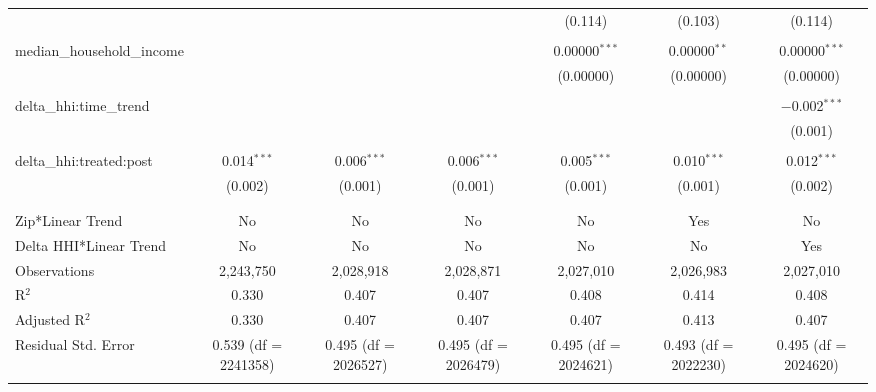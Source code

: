 \begin{table}[H]
{\begin{tabular}{@{\extracolsep{5pt}}lcccccc}
   &  &  &  & (0.114) & (0.103) & (0.114) \\  

   & & & & & & \\  

  median\_household\_income &  &  &  & 0.00000$^{***}$ & 0.00000$^{**}$ & 0.00000$^{***}$ \\  

   &  &  &  & (0.00000) & (0.00000) & (0.00000) \\  

   & & & & & & \\  

  delta\_hhi:time\_trend &  &  &  &  &  & $-$0.002$^{***}$ \\  

   &  &  &  &  &  & (0.001) \\  

   & & & & & & \\  

  delta\_hhi:treated:post & 0.014$^{***}$ & 0.006$^{***}$ & 0.006$^{***}$ & 0.005$^{***}$ & 0.010$^{***}$ & 0.012$^{***}$ \\  

   & (0.002) & (0.001) & (0.001) & (0.001) & (0.001) & (0.002) \\  

   & & & & & & \\  

 \hline \\[-1.8ex]  

 Zip*Linear Trend & No & No & No & No & Yes & No \\  

 Delta HHI*Linear Trend & No & No & No & No & No & Yes \\  

 Observations & 2,243,750 & 2,028,918 & 2,028,871 & 2,027,010 & 2,026,983 & 2,027,010 \\  

 R$^{2}$ & 0.330 & 0.407 & 0.407 & 0.408 & 0.414 & 0.408 \\  

 Adjusted R$^{2}$ & 0.330 & 0.407 & 0.407 & 0.407 & 0.413 & 0.407 \\  

 Residual Std. Error & 0.539 (df = 2241358) & 0.495 (df = 2026527) & 0.495 (df = 2026479) & 0.495 (df = 2024621) & 0.493 (df = 2022230) & 0.495 (df = 2024620) \\  

 \hline  

 \hline \\[-1.8ex]  


\end{tabular}}
\end{table}
